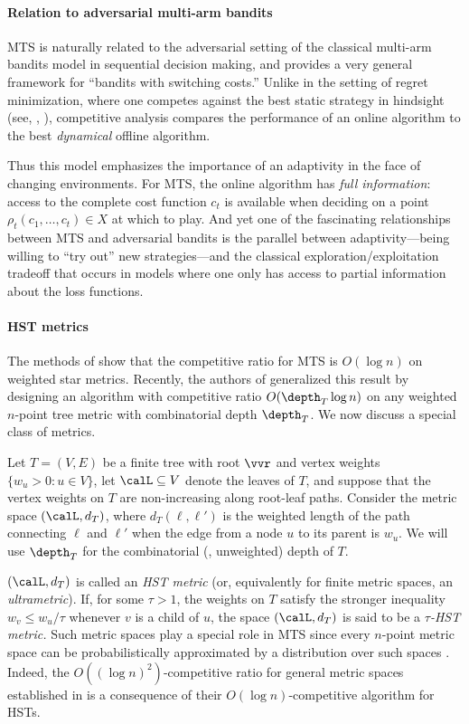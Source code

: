 \paragraph{Relation to adversarial multi-arm bandits}
MTS is naturally related to the adversarial setting of the
classical multi-arm bandits model in sequential decision making,
and provides a very general framework for ``bandits with switching costs.''
Unlike in the setting of regret minimization, where one competes
against the best static strategy in hindsight (see, \eg, \cite{BN12}),
competitive analysis compares the performance of an online algorithm
to the best \emph{dynamical} offline algorithm.

Thus this model emphasizes the importance of
an adaptivity in the face of changing environments.
For MTS, the online algorithm has \emph{full information}: access to
the complete cost function $c_t$ is available when deciding on a point $\rho_t(c_1,\ldots,c_t) \in X$
at which to play.
And yet
one of the fascinating relationships 
between MTS and adversarial bandits is the parallel between
adaptivity---being willing to ``try out'' new strategies---and
the classical exploration/exploitation tradeoff that
occurs in models where one only has access to partial information about
the loss functions.

\paragraph{HST metrics}
The methods of \cite{BBN12} show that the competitive ratio for MTS is $O(\log n)$
on weighted star metrics.  Recently, the authors of \cite{BCLL19} generalized this
result by designing an algorithm with competitive ratio $O(\depth_T \log n)$
on any weighted $n$-point tree metric with combinatorial depth $\depth_T$.
We now discuss a special class of metrics.

Let $T=(V,E)$ be a finite tree with root $\vvr$ and vertex weights
$\{ w_u > 0 : u \in V\}$,
let $\calL \subseteq V$ denote the leaves of $T$,
and suppose that the vertex weights on $T$ are non-increasing along root-leaf paths.
Consider the metric space $(\calL,d_T)$, where $d_T(\ell,\ell')$ is the weighted length of the path connecting $\ell$ and $\ell'$ when the edge from a node $u$ to its parent is $w_u$.
We will use $\depth_T$ for the combinatorial (\ie, unweighted) depth of $T$.

$(\calL,d_T)$ is called an \emph{HST metric} (or, equivalently
for finite metric spaces, an \emph{ultrametric}).
If, for some $\tau > 1$, the weights on $T$ satisfy the stronger inequality $w_v \leq w_u/\tau$ whenever
$v$ is a child of $u$, the space $(\calL,d_T)$ is said to be a \emph{$\tau$-HST metric.}
Such metric spaces play a special role in MTS since every $n$-point
metric space can be probabilistically approximated by a distribution over
such spaces \cite{Bar96,FRT04}.  Indeed, the $O((\log n)^2)$-competitive ratio
for general metric spaces established in \cite{BCLL19} is a consequence
of their $O(\log n)$-competitive algorithm for HSTs.

